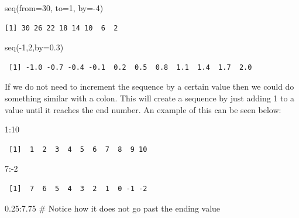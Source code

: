 \documentclass[
  letterpaper,
  DIV=11,
  numbers=noendperiod]{scrreprt}
\newenvironment{Shaded}{\begin{snugshade}}{\end{snugshade}}
\newcommand{\AttributeTok}[1]{\textcolor[rgb]{0.40,0.45,0.13}{#1}}
\newcommand{\CommentTok}[1]{\textcolor[rgb]{0.37,0.37,0.37}{#1}}
\newcommand{\DecValTok}[1]{\textcolor[rgb]{0.68,0.00,0.00}{#1}}
\newcommand{\FloatTok}[1]{\textcolor[rgb]{0.68,0.00,0.00}{#1}}
\newcommand{\FunctionTok}[1]{\textcolor[rgb]{0.28,0.35,0.67}{#1}}
\newcommand{\NormalTok}[1]{\textcolor[rgb]{0.00,0.23,0.31}{#1}}
\newcommand{\SpecialCharTok}[1]{\textcolor[rgb]{0.37,0.37,0.37}{#1}}
\begin{document}
\begin{Shaded}
\begin{Highlighting}[]
\FunctionTok{seq}\NormalTok{(}\AttributeTok{from=}\DecValTok{30}\NormalTok{, }\AttributeTok{to=}\DecValTok{1}\NormalTok{, }\AttributeTok{by=}\SpecialCharTok{{-}}\DecValTok{4}\NormalTok{)}
\end{Highlighting}
\end{Shaded}

\begin{verbatim}
[1] 30 26 22 18 14 10  6  2
\end{verbatim}

\begin{Shaded}
\begin{Highlighting}[]
\FunctionTok{seq}\NormalTok{(}\SpecialCharTok{{-}}\DecValTok{1}\NormalTok{,}\DecValTok{2}\NormalTok{,}\AttributeTok{by=}\FloatTok{0.3}\NormalTok{)}
\end{Highlighting}
\end{Shaded}

\begin{verbatim}
 [1] -1.0 -0.7 -0.4 -0.1  0.2  0.5  0.8  1.1  1.4  1.7  2.0
\end{verbatim}

If we do not need to increment the sequence by a certain value then we
could do something similar with a colon. This will create a sequence by
just adding 1 to a value until it reaches the end number. An example of
this can be seen below:

\begin{Shaded}
\begin{Highlighting}[]
\DecValTok{1}\SpecialCharTok{:}\DecValTok{10}
\end{Highlighting}
\end{Shaded}

\begin{verbatim}
 [1]  1  2  3  4  5  6  7  8  9 10
\end{verbatim}

\begin{Shaded}
\begin{Highlighting}[]
\DecValTok{7}\SpecialCharTok{:{-}}\DecValTok{2}
\end{Highlighting}
\end{Shaded}

\begin{verbatim}
 [1]  7  6  5  4  3  2  1  0 -1 -2
\end{verbatim}

\begin{Shaded}
\begin{Highlighting}[]
\FloatTok{0.25}\SpecialCharTok{:}\FloatTok{7.75} \CommentTok{\# Notice how it does not go past the ending value}
\end{Highlighting}
\end{Shaded}
\end{document}
